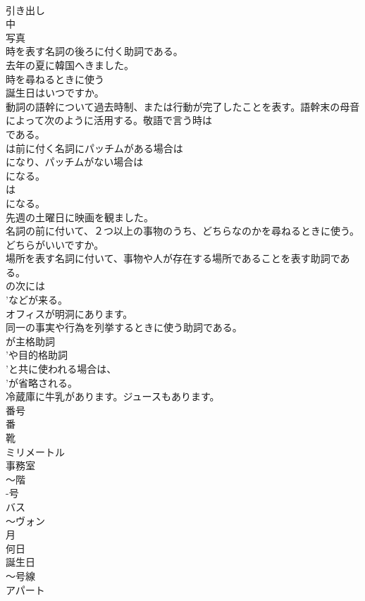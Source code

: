 \documentclass[8pt]{extreport}
\begin{document}
\begin{CJK}{UTF8}{min}
\\	引き出し
\\	中
\\	写真
\\	時を表す名詞の後ろに付く助詞である。	
\\	去年の夏に韓国へきました。
\\	時を尋ねるときに使う	
\\	誕生日はいつですか。
\\	動詞の語幹について過去時制、または行動が完了したことを表す。語幹末の母音によって次のように活用する。敬語で言う時は
\\	である。　
\\	は前に付く名詞にパッチムがある場合は
\\	になり、パッチムがない場合は
\\	になる。
\\	は 
\\	になる。	
\\	先週の土曜日に映画を観ました。
\\	名詞の前に付いて、２つ以上の事物のうち、どちらなのかを尋ねるときに使う。	
\\	どちらがいいですか。
\\	場所を表す名詞に付いて、事物や人が存在する場所であることを表す助詞である。
\\	の次には 
\\	'などが来る。	
\\	オフィスが明洞にあります。
\\	同一の事実や行為を列挙するときに使う助詞である。
\\	が主格助詞
\\	'や目的格助詞
\\	'と共に使われる場合は、
\\	'が省略される。	
\\	冷蔵庫に牛乳があります。ジュースもあります。
\\	番号
\\	番
\\	靴
\\	ミリメートル
\\	事務室
\\	～階
\\	-号
\\	バス
\\	～ヴォン
\\	月
\\	何日
\\	誕生日
\\	～号線
\\	アパート

\end{CJK}
\end{document}
